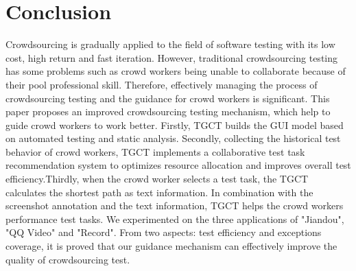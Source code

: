 \section{Conclusion}
Crowdsourcing is gradually applied to the field of software testing with its low cost, high return and fast iteration. However, traditional crowdsourcing testing has some problems such as crowd workers being unable to collaborate because of their pool professional skill. Therefore, effectively managing the process of crowdsourcing testing and the guidance for crowd workers is significant.
This paper proposes an improved crowdsourcing testing mechanism, which help to guide crowd workers to work better. Firstly, TGCT builds the GUI model based on automated testing and static analysis. Secondly, collecting the historical test behavior of crowd workers, TGCT implements a collaborative test task recommendation system to optimizes resource allocation and improves overall test efficiency.Thirdly, when the crowd worker selects a test task, the TGCT calculates the shortest path as text information. In combination with the screenshot annotation and the text information, TGCT helps the crowd workers performance test tasks. We experimented on the three applications of "Jiandou", "QQ Video" and "Record". From two aspects: test efficiency and exceptions coverage, it is proved that our guidance mechanism can effectively improve the quality of crowdsourcing test.